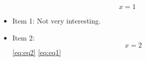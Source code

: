 \documentclass{beamer}
\begin{document}
\begin{frame}[fragile]

\begin{equation}
    x=1
\label{eq:eq1}
\end{equation}

\begin{itemize}[<+->]
    \item[] Item 1: Not very interesting.
    \item[] Item 2:
            \begin{equation}
                x=2
            \label{eq:eq2}
            \end{equation}
            \ref{eq:eq2} \ref{eq:eq1}
\end{itemize}

\end{frame}
\end{document}
